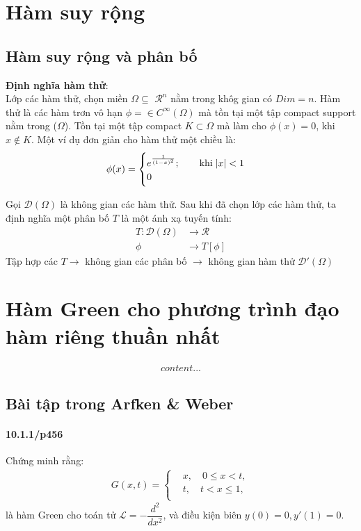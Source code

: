 \documentclass{report}
\begin{document}
\chapter{Hàm suy rộng}
\section{Hàm suy rộng và phân bố}
\textbf{Định nghĩa hàm thử}:\\
Lớp các hàm thử, chọn miền $\Omega \subseteq$ $\mathscr{R}^n$ nằm trong khôg gian có $Dim = n$. Hàm thử là các hàm trơn vô hạn $\phi = \in C^{\infty}(\Omega)$ mà tồn tại một tập compact support nằm trong ($\Omega$). Tồn tại một tập compact $K \subset \Omega$ mà làm cho $\phi(x) = 0$, khi $x \notin K$. Một ví dụ đơn giản cho hàm thử một chiều là:
\begin{align*}
	\phi(x) =
	\begin{cases}
		e^{\frac{1}{(1-x)^2}}; \quad \quad \text{khi} \; \abs{x}<1 \\
		0
	\end{cases}
\end{align*}

Gọi $\mathcal{D}(\Omega)$ là không gian các hàm thử. Sau khi đã chọn lớp các hàm thử, ta định nghĩa một phân bố $T$ là một ánh xạ tuyến tính:
\begin{align*}
	T:  \mathcal{D}(\Omega) & \rightarrow \mathscr{R} \\
	\phi                    & \rightarrow T[\phi]
\end{align*}
Tập hợp các $T\rightarrow$ không gian các phân bố $\rightarrow$ không gian hàm thử $\mathcal{D}'(\Omega)$

\chapter{Hàm Green cho phương trình đạo hàm riêng thuần nhất}
\begin{align*}
	content...
\end{align*}

\section{Bài tập trong Arfken \& Weber}


\subsubsection{10.1.1/p456}
Chứng minh rằng:
\begin{align*}
	G(x,t) =
	\begin{cases}
		 & x , \quad 0 \leq x < t, \\
		 & t , \quad t < x\leq 1 , \\
	\end{cases}
\end{align*}
là hàm Green cho toán tử $\mathcal{L} = -\dfrac{d^2}{dx^2}$, và điều kiện biên $y(0) = 0, y'(1) = 0$.\\
\end{document}
